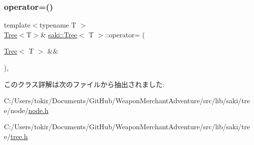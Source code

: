 \subsubsection{\texorpdfstring{operator=()}{operator=()}\hspace{0.1cm}{\footnotesize\ttfamily [2/2]}}
{\footnotesize\ttfamily template$<$typename T $>$ \\
\mbox{\hyperlink{classsaki_1_1_tree}{Tree}}$<$T$>$\& \mbox{\hyperlink{classsaki_1_1_tree}{saki\+::\+Tree}}$<$ T $>$\+::operator= (\begin{DoxyParamCaption}\item[{\mbox{\hyperlink{classsaki_1_1_tree}{Tree}}$<$ T $>$ \&\&}]{ }\end{DoxyParamCaption})\hspace{0.3cm}{\ttfamily [default]}, {\ttfamily [noexcept]}}



このクラス詳解は次のファイルから抽出されました\+:\begin{DoxyCompactItemize}
\item 
C\+:/\+Users/tokir/\+Documents/\+Git\+Hub/\+Weapon\+Merchant\+Adventure/src/lib/saki/tree/node/\mbox{\hyperlink{node_8h}{node.\+h}}\item 
C\+:/\+Users/tokir/\+Documents/\+Git\+Hub/\+Weapon\+Merchant\+Adventure/src/lib/saki/tree/\mbox{\hyperlink{tree_8h}{tree.\+h}}\end{DoxyCompactItemize}
